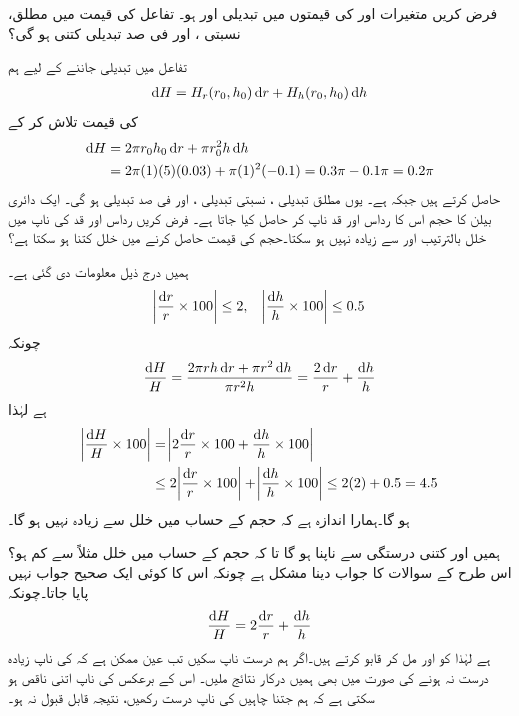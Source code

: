 فرض کریں متغیرات  اور  کی   قیمتوں    میں تبدیلی   اور  ہو۔ تفاعل   کی قیمت میں مطلق، نسبتی ، اور فی صد تبدیلی کتنی ہو گی؟

تفاعل  میں تبدیلی جاننے کے لیے ہم
\begin{align*}
\dif H=H_r(r_0,h_0)\dif r+H_h(r_0,h_0)\dif h
\end{align*}
کی قیمت تلاش کر کے
\begin{align*}
\dif H&=2\pi r_0h_0\dif r+\pi r_0^2h\dif h\\
&=2\pi(1)(5)(0.03)+\pi(1)^2(-0.1)=0.3\pi-0.1\pi=0.2\pi
\end{align*}
حاصل کرتے ہیں جبکہ    ہے۔  یوں مطلق تبدیلی ،  نسبتی تبدیلی ،  اور فی صد تبدیلی  ہو گی۔ 
ایک دائری بیلن  کا حجم   اس کا رداس اور قد ناپ کر حاصل کیا جاتا ہے۔ فرض کریں رداس اور قد  کی ناپ میں خلل  بالترتیب   اور   سے زیادہ نہیں ہو سکتا۔حجم  کی قیمت حاصل کرنے میں خلل کتنا ہو سکتا ہے؟

ہمیں درج ذیل معلومات دی گئی ہے۔
\begin{align*}
\abs{\frac{\dif r}{r}\times 100}\le 2,\quad \abs{\frac{\dif h}{h}\times 100}\le 0.5
\end{align*}
چونکہ
\begin{align*}
\frac{\dif H}{H}=\frac{2\pi rh\dif r+\pi r^2\dif h}{\pi r^2h}=\frac{2\dif r}{r}+\frac{\dif h}{h}
\end{align*}
ہے لہٰذا 
\begin{align*}
\abs{\frac{\dif H}{H}\times 100}&=\abs{2\frac{\dif r}{r}\times 100+\frac{\dif h}{h}\times 100}\\
&\le 2\abs{\frac{\dif r}{r}\times 100}+\abs{\frac{\dif h}{h}\times 100}\le 2(2)+0.5=4.5
\end{align*}
ہو گا۔ہمارا اندازہ  ہے کہ حجم  کے حساب میں خلل   سے زیادہ نہیں ہو گا۔

ہمیں  اور  کتنی درستگی سے ناپنا ہو گا تا کہ حجم کے حساب میں خلل  مثلاً  سے کم  ہو؟ اس طرح کے سوالات کا جواب دینا مشکل ہے چونکہ اس کا کوئی ایک صحیح جواب نہیں پایا جاتا۔چونکہ
\begin{align*}
\frac{\dif H}{H}=2\frac{\dif r}{r}+\frac{\dif h}{h}
\end{align*}
ہے لہٰذا  کو  اور   مل کر قابو کرتے ہیں۔اگر ہم  درست  ناپ سکیں تب  عین  ممکن ہے کہ  کی ناپ زیادہ درست نہ ہونے کی صورت میں بھی ہمیں درکار نتائج  ملیں۔ اس کے برعکس     کی ناپ اتنی ناقص ہو سکتی ہے کہ ہم جتنا چاہیں  کی ناپ درست رکھیں، نتیجہ قابل قبول نہ ہو۔

